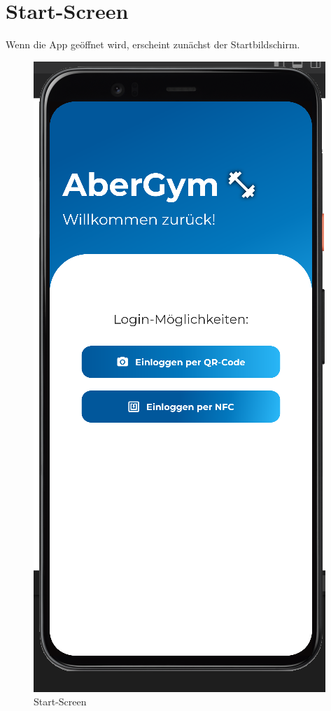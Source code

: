 \section{Start-Screen}

Wenn die App geöffnet wird, erscheint zunächst der Startbildschirm.

\begin{figure}[H]
        \centering
        \includegraphics[scale=0.3]{pics/Start-Screen.png}
        \caption{Start-Screen}
    \end{figure}

